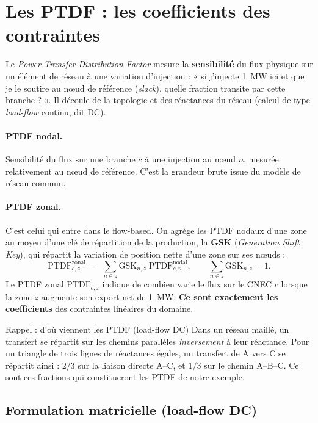 \documentclass[11pt,a4paper]{article}
\newcommand{\PTDF}{\mathrm{PTDF}}
\newcommand{\GSK}{\mathrm{GSK}}
\begin{document}
\section{Les PTDF : les coefficients des contraintes}

Le \emph{Power Transfer Distribution Factor} mesure la \textbf{sensibilité}
du flux physique sur un élément de réseau à une variation d'injection :
« si j'injecte 1~MW ici et que je le soutire au n\oe{}ud de référence
(\emph{slack}), quelle fraction transite par cette branche ? ». Il découle
de la topologie et des réactances du réseau (calcul de type
\emph{load-flow} continu, dit DC).

\paragraph{PTDF nodal.} Sensibilité du flux sur une branche $c$ à une
injection au n\oe{}ud $n$, mesurée relativement au n\oe{}ud de référence.
C'est la grandeur brute issue du modèle de réseau commun.

\paragraph{PTDF zonal.} C'est celui qui entre dans le flow-based. On agrège
les PTDF nodaux d'une zone au moyen d'une clé de répartition de la
production, la \textbf{GSK} (\emph{Generation Shift Key}), qui répartit la
variation de position nette d'une zone sur ses n\oe{}uds :
\[
  \PTDF^{\text{zonal}}_{c,z}
   \;=\; \sum_{n \in z} \GSK_{n,z}\;\PTDF^{\text{nodal}}_{c,n},
   \qquad \sum_{n\in z}\GSK_{n,z}=1 .
\]
Le PTDF zonal $\PTDF_{c,z}$ indique de combien varie le flux sur le CNEC
$c$ lorsque la zone $z$ augmente son export net de 1~MW. \textbf{Ce sont
exactement les coefficients} des contraintes linéaires du domaine.

\begin{rembox}{Rappel : d'où viennent les PTDF (load-flow DC)}
Dans un réseau maillé, un transfert se répartit sur les chemins parallèles
\emph{inversement} à leur réactance. Pour un triangle de trois lignes de
réactances égales, un transfert de A vers C se répartit ainsi :
$2/3$ sur la liaison directe A--C, et $1/3$ sur le chemin A--B--C. Ce sont
ces fractions qui constitueront les PTDF de notre exemple.
\end{rembox}

\subsection{Formulation matricielle (load-flow DC)}
\label{sec:matrice}
\end{document}
